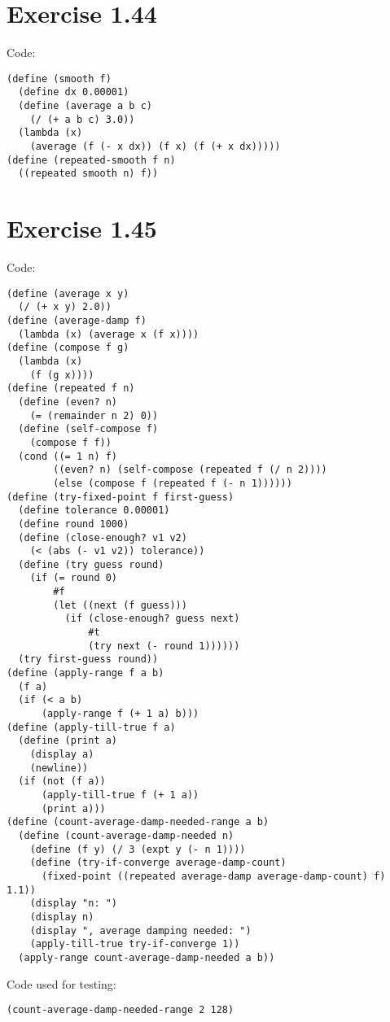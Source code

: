 \documentclass[../main.tex]{subfiles}
\begin{document}
\section{Exercise 1.44}

Code:

\begin{lstlisting}
(define (smooth f)
  (define dx 0.00001)
  (define (average a b c)
    (/ (+ a b c) 3.0))
  (lambda (x)
    (average (f (- x dx)) (f x) (f (+ x dx)))))
(define (repeated-smooth f n)
  ((repeated smooth n) f))
\end{lstlisting}

\section{Exercise 1.45}

Code:

\begin{lstlisting}
(define (average x y)
  (/ (+ x y) 2.0))
(define (average-damp f)
  (lambda (x) (average x (f x))))
(define (compose f g)
  (lambda (x)
    (f (g x))))
(define (repeated f n)
  (define (even? n)
    (= (remainder n 2) 0))
  (define (self-compose f)
    (compose f f))
  (cond ((= 1 n) f)
        ((even? n) (self-compose (repeated f (/ n 2))))
        (else (compose f (repeated f (- n 1))))))
(define (try-fixed-point f first-guess)
  (define tolerance 0.00001)
  (define round 1000)
  (define (close-enough? v1 v2)
    (< (abs (- v1 v2)) tolerance))
  (define (try guess round)
    (if (= round 0)
        #f
        (let ((next (f guess)))
          (if (close-enough? guess next)
              #t
              (try next (- round 1))))))
  (try first-guess round))
(define (apply-range f a b)
  (f a)
  (if (< a b)
      (apply-range f (+ 1 a) b)))
(define (apply-till-true f a)
  (define (print a)
    (display a)
    (newline))
  (if (not (f a))
      (apply-till-true f (+ 1 a))
      (print a)))
(define (count-average-damp-needed-range a b)
  (define (count-average-damp-needed n)
    (define (f y) (/ 3 (expt y (- n 1))))
    (define (try-if-converge average-damp-count)
      (fixed-point ((repeated average-damp average-damp-count) f) 1.1))
    (display "n: ")
    (display n)
    (display ", average damping needed: ")
    (apply-till-true try-if-converge 1))
  (apply-range count-average-damp-needed a b))
\end{lstlisting}

Code used for testing:

\begin{lstlisting}
(count-average-damp-needed-range 2 128)
\end{lstlisting}
\end{document}
